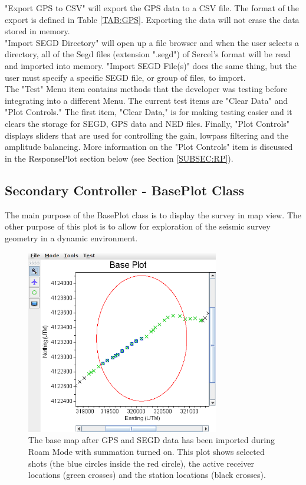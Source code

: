 \documentclass[12pt]{article}
\begin{document}
"Export GPS to CSV" will export the GPS data to a CSV file. The format of the export is defined in Table \ref{TAB:GPS}. Exporting the data will not erase the data stored in memory. \\

"Import SEGD Directory" will open up a file browser and when the user selects a directory, all of the Segd files (extension ".segd") of Sercel's format will be read and imported into memory. "Import SEGD File(s)" does the same thing, but the user must specify a specific SEGD file, or group of files, to import. \\

The "Test" Menu item contains methods that the developer was testing before integrating into a different Menu. The current test items are "Clear Data" and "Plot Controls." The first item, "Clear Data," is for making testing easier and it clears the storage for SEGD, GPS data and NED files. Finally, "Plot Controls" displays sliders that are used for controlling the gain, lowpass filtering and the amplitude balancing. More information on the "Plot Controls" item is discussed in the ResponsePlot section below (see Section \ref{SUBSEC:RP}).

\subsection{Secondary Controller - BasePlot Class}
\label{SUBSEC:BPC}

The main purpose of the BasePlot class is to display the survey in map view. The other purpose of this plot is to allow for exploration of the seismic survey geometry in a dynamic environment. 

\begin{figure}[h]
\centering
\includegraphics[width=0.75\textwidth]{./figs/fig1.png}
\caption{The base map after GPS and SEGD data has been imported during Roam Mode with summation turned on. This plot shows selected shots (the blue circles inside the red circle), the active receiver locations (green crosses) and the station locations (black crosses).}
\label{FIG:BP}
\end{figure}
\end{document}
